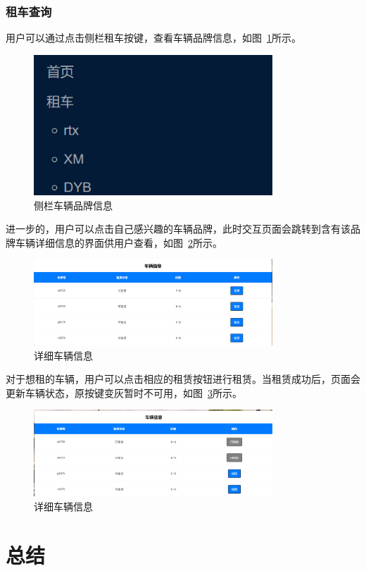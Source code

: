 \documentclass[UTF8,a4paper,12pt]{ctexart}
\begin{document}
\subsubsection{租车查询}
用户可以通过点击侧栏租车按键，查看车辆品牌信息，如图~\ref{fig:br}所示。
\begin{figure}[htbp]  %
    \centering  %
    \includegraphics[width=0.8\textwidth]{pic/br.png}
    \caption{侧栏车辆品牌信息}  %
    \label{fig:br}  %
\end{figure}
进一步的，用户可以点击自己感兴趣的车辆品牌，此时交互页面会跳转到含有该品牌车辆详细信息的界面供用户查看，如图~\ref{fig:car}所示。
\begin{figure}[htbp]  %
    \centering  %
    \includegraphics[width=0.8\textwidth]{pic/car.png}
    \caption{详细车辆信息}  %
    \label{fig:car}  %
\end{figure}
对于想租的车辆，用户可以点击相应的租赁按钮进行租赁。当租赁成功后，页面会更新车辆状态，原按键变灰暂时不可用，如图~\ref{fig:rented}所示。
\begin{figure}[htbp]  %
    \centering  %
    \includegraphics[width=0.8\textwidth]{pic/rented.png}
    \caption{详细车辆信息}  %
    \label{fig:rented}  %
\end{figure}

\section{总结}

\end{document}
